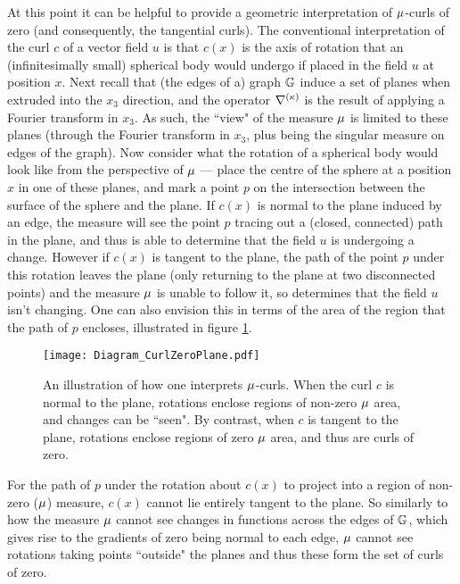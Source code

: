 At this point it can be helpful to provide a geometric interpretation of $\mu$-curls of zero (and consequently, the tangential curls).
The conventional interpretation of the curl $c$ of a vector field $u$ is that $c(x)$ is the axis of rotation that an (infinitesimally small) spherical body would undergo if placed in the field $u$ at position $x$.
Next recall that (the edges of a) graph $\mathbb{G}$ induce a set of planes when extruded into the $x_3$ direction, and the operator $\nabla^{(\kappa)}$ is the result of applying a Fourier transform in $x_3$.
As such, the ``view" of the measure $\mu$ is limited to these planes (through the Fourier transform in $x_3$, plus being the singular measure on edges of the graph).
Now consider what the rotation of a spherical body would look like from the perspective of $\mu$ --- place the centre of the sphere at a position $x$ in one of these planes, and mark a point $p$ on the intersection between the surface of the sphere and the plane. 
If $c(x)$ is normal to the plane induced by an edge, the measure will see the point $p$ tracing out a (closed, connected) path in the plane, and thus is able to determine that the field $u$ is undergoing a change.
However if $c(x)$ is tangent to the plane, the path of the point $p$ under this rotation leaves the plane (only returning to the plane at two disconnected points) and the measure $\mu$ is unable to follow it, so determines that the field $u$ isn't changing.
One can also envision this in terms of the area of the region that the path of $p$ encloses, illustrated in figure \ref{fig:Diagram_CurlZeroPlane}.
\begin{figure}[b!]
	\centering
	\texttt{[image: Diagram\_CurlZeroPlane.pdf]}
	\caption{\label{fig:Diagram_CurlZeroPlane} An illustration of how one interprets $\mu$-curls. When the curl $c$ is normal to the plane, rotations enclose regions of non-zero $\mu$ area, and changes can be ``seen". By contrast, when $c$ is tangent to the plane, rotations enclose regions of zero $\mu$ area, and thus are curls of zero.}
\end{figure}
For the path of $p$ under the rotation about $c(x)$ to project into a region of non-zero ($\mu$) measure, $c(x)$ cannot lie entirely tangent to the plane.
So similarly to how the measure $\mu$ cannot see changes in functions across the edges of $\mathbb{G}$, which gives rise to the gradients of zero being normal to each edge, $\mu$ cannot see rotations taking points ``outside" the planes and thus these form the set of curls of zero.

